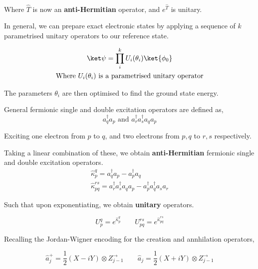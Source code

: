 Where $\hat T$ is now an \textbf{anti-Hermitian} operator, and $e^{\hat T}$ is unitary.

In general, we can prepare exact electronic states by applying a sequence of $k$ parametrised unitary operators to our reference state.

\begin{equation*}
\begin{gathered}
    \ket\psi = \prod_i^k U_i(\theta_i) \ket{\phi_0} \\
    \text{Where $U_i(\theta_i)$ is a parametrised unitary operator}
\end{gathered}
\end{equation*}\smallskip

The parameters $\theta_i$ are then optimised to find the ground state energy.

General fermionic single and double excitation operators are defined as,
\begin{equation*}
    a_q^\dagger a_p \text{ and } a_r^\dagger a_s^\dagger a_q a_p
\end{equation*}

Exciting one electron from $p$ to $q$, and two electrons from $p, q$ to $r, s$ respectively.

Taking a linear combination of these, we obtain \textbf{anti-Hermitian} fermionic single and double excitation operators.
\begin{equation*}
\begin{gathered}
    \hat\kappa_p^q = a_q^\dagger a_p - a_p^\dagger a_q \\
    \hat\kappa_{pq}^{rs} =
    a_r^\dagger a_s^\dagger a_q a_p - a_p^\dagger a_q^\dagger a_s a_r
\end{gathered}
\end{equation*}\smallskip

Such that upon exponentiating, we obtain \textbf{unitary} operators.

\begin{equation*}
    U^q_p = e^{\hat\kappa_p^q} \qquad
    U_{pq}^{rs} = e^{\hat\kappa_{pq}^{rs}}
\end{equation*}

Recalling the Jordan-Wigner encoding for the creation and annhilation operators,

\begin{equation*}
    \hat a_j^+ = \frac{1}{2} (X - iY) \otimes Z^\rightarrow_{j-1} \qquad
    \hat a_j = \frac{1}{2} (X + iY) \otimes Z^\rightarrow_{j-1}
\end{equation*}

